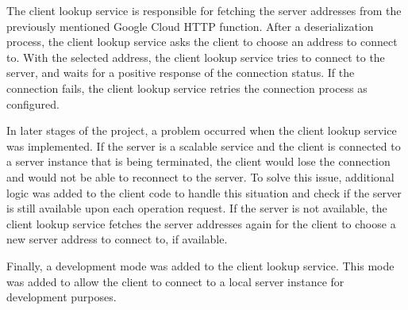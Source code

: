 The client lookup service is responsible
for fetching the server addresses from the previously mentioned Google Cloud HTTP function.
After a deserialization process, the client lookup service asks the client to choose an address to connect to.
With the selected address, the client lookup service tries to connect to the server,
and waits for a positive response of the connection status.
If the connection fails, the client lookup service retries the connection process as configured.

In later stages of the project, a problem occurred when the client lookup service was implemented.
If the server is a scalable service and the client is connected to a server instance that is being terminated,
the client would lose the connection and would not be able to reconnect to the server.
To solve this issue,
additional logic was added to the client code to handle this situation
and check if the server is still available upon each operation request.
If the server is not available, the client lookup service fetches the server addresses again
for the client to choose a new server address to connect to, if available.

Finally, a development mode was added to the client lookup service.
This mode was added to allow the client to connect to a local server instance for development purposes.
